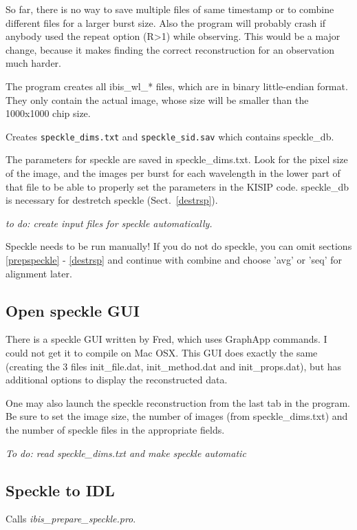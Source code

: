 \documentclass[a4paper,11pt]{article}
\begin{document}
So far, there is no way to save multiple files of same timestamp or to combine different files for a larger burst size. Also the program will probably crash if anybody used the repeat option (R>1) while observing. This would be a major change, because it makes finding the correct reconstruction for an observation much harder.

The program creates all ibis\_wl\_* files, which are in binary little-endian format. They only contain the actual image, whose size will be smaller than the 1000x1000 chip size.

Creates \texttt{speckle\_dims.txt} and \texttt{speckle\_sid.sav} which contains speckle\_db.

The parameters for speckle are saved in speckle\_dims.txt. Look for the pixel size of the image, and the images per burst for each wavelength in the lower part of that file to be able to properly set the parameters in the KISIP code. speckle\_db is necessary for destretch speckle (Sect.~\ref{destrsp}).

\textit{to do: create input files for speckle automatically.}

Speckle needs to be run manually! If you do not do speckle, you can omit sections \ref{prepspeckle} - \ref{destrsp} and continue with combine and choose 'avg' or 'seq' for alignment later.

\subsection{Open speckle GUI}
\label{sgui}

There is a speckle GUI written by Fred, which uses GraphApp commands. I could not get it to compile on Mac OSX.
This GUI does exactly the same (creating the 3 files init\_file.dat,
init\_method.dat and init\_props.dat), but has additional options to
display the reconstructed data. 

One may also launch the speckle reconstruction from the last tab in
the program. Be sure to set the image size, the number of images (from
speckle\_dims.txt) and
the number of speckle files in the appropriate fields. 

\textit{To do: read speckle\_dims.txt and make speckle automatic}


\subsection{Speckle to IDL}
\label{stoi}
Calls \textit{ibis\_prepare\_speckle.pro}.
\end{document}
